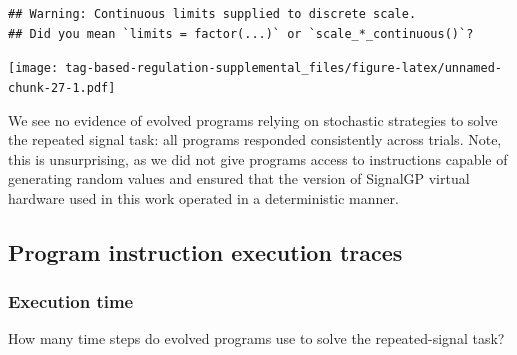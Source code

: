 \documentclass[
]{book}
\begin{document}
\begin{verbatim}
## Warning: Continuous limits supplied to discrete scale.
## Did you mean `limits = factor(...)` or `scale_*_continuous()`?
\end{verbatim}

\texttt{[image: tag-based-regulation-supplemental\_files/figure-latex/unnamed-chunk-27-1.pdf]}

We see no evidence of evolved programs relying on stochastic strategies to solve the repeated signal task: all programs responded consistently across trials.
Note, this is unsurprising, as we did not give programs access to instructions capable of generating random values and ensured that the version of SignalGP virtual hardware used in this work operated in a deterministic manner.

\hypertarget{program-instruction-execution-traces}{%
\subsection{Program instruction execution traces}\label{program-instruction-execution-traces}}

\hypertarget{execution-time}{%
\subsubsection{Execution time}\label{execution-time}}

How many time steps do evolved programs use to solve the repeated-signal task?
\end{document}
